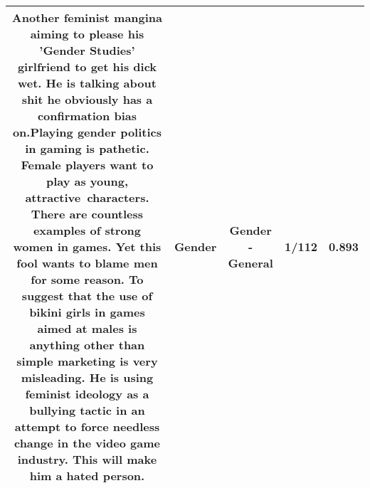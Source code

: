 \documentclass[11pt]{article}
\newlength\mylength
\begin{document}
\begin{center}
\begin{longtable}{|C{.65\mylength}|C{.30\mylength}|C{.12\mylength}|C{.12\mylength}|C{.12\mylength}|}
  \small Another feminist mangina aiming to please his '\textbf{Gender} Studies' girlfriend to get his dick wet. He is talking about shit he obviously has a confirmation bias on.Playing \textbf{gender} politics in gaming is pathetic. Female players want to play as young, attractive characters. There are countless examples of strong women in games. Yet this fool wants to blame men for some reason. To suggest that the use of bikini girls in games aimed at males is anything other than simple marketing is very misleading. He is using feminist ideology as a bullying tactic in an attempt to force needless change in the video game industry. This will make him a hated person.\normalsize   & Gender & Gender - General & 1/112 & 0.893 \\  \hline

\end{longtable}
\end{center}
\end{document}
